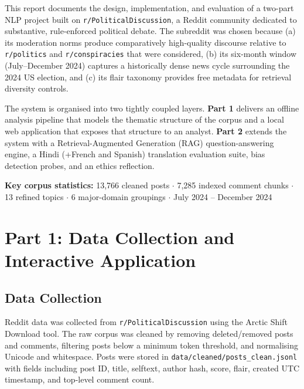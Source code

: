 \documentclass[11pt,a4paper]{article}
\begin{document}
This report documents the design, implementation, and evaluation of a two-part NLP project built on \texttt{r/PoliticalDiscussion}, a Reddit community dedicated to substantive, rule-enforced political debate. The subreddit was chosen because (a) its moderation norms produce comparatively high-quality discourse relative to \texttt{r/politics} and \texttt{r/conspiracies} that were considered, (b) its six-month window (July--December 2024) captures a historically dense news cycle surrounding the 2024 US election, and (c) its flair taxonomy provides free metadata for retrieval diversity controls.

The system is organised into two tightly coupled layers. \textbf{Part 1} delivers an offline analysis pipeline that models the thematic structure of the corpus and a local web application that exposes that structure to an analyst. \textbf{Part 2} extends the system with a Retrieval-Augmented Generation (RAG) question-answering engine, a Hindi (+French and Spanish) translation evaluation suite, bias detection probes, and an ethics reflection.

\begin{tcolorbox}[metricbox, title=]
\textbf{Key corpus statistics:} 13{,}766 cleaned posts $\cdot$ 7{,}285 indexed comment chunks $\cdot$ 13 refined topics $\cdot$ 6 major-domain groupings $\cdot$ July 2024 -- December 2024
\end{tcolorbox}

\section{Part 1: Data Collection and Interactive Application}

\subsection{Data Collection}

Reddit data was collected from \texttt{r/PoliticalDiscussion} using the Arctic Shift Download tool. The raw corpus was cleaned by removing deleted/removed posts and comments, filtering posts below a minimum token threshold, and normalising Unicode and whitespace. Posts were stored in \texttt{data/cleaned/posts\_clean.jsonl} with fields including post ID, title, selftext, author hash, score, flair, created UTC timestamp, and top-level comment count.
\end{document}

